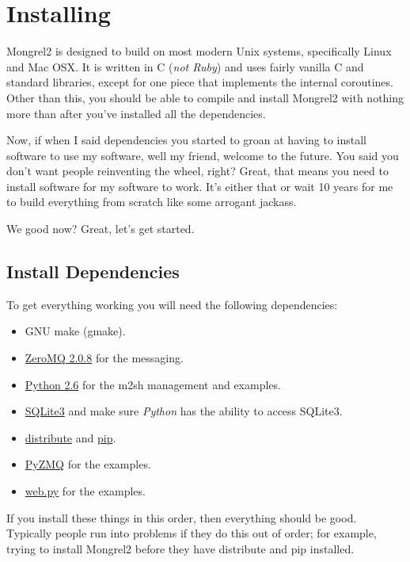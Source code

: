 \chapter{Installing}

Mongrel2 is designed to build on most modern Unix systems, specifically Linux
and Mac OSX.  It is written in C (\emph{not Ruby}) and uses fairly vanilla
C and standard libraries, except for one piece that implements the internal
coroutines.  Other than this, you should be able to compile and install Mongrel2
with nothing more than  after you've installed
all the dependencies.

Now, if when I said dependencies you started to groan at having to install
software to use my software, well my friend, welcome to the future.  You
said you don't want people reinventing the wheel, right?  Great, that means
you need to install software for my software to work.  It's either that or
wait 10 years for me to build everything from scratch like some arrogant
jackass.

We good now?  Great, let's get started.

\section{Install Dependencies}

To get everything working you will need the following dependencies:

\begin{itemize}
\item GNU make (gmake).
\item \href{http://zeromq.org}{ZeroMQ 2.0.8} for the messaging.
\item \href{http://python.org}{Python 2.6} for the m2sh management and examples.
\item \href{http://www.sqlite.org/}{SQLite3} and make sure \emph{Python} has the ability to access SQLite3.
\item \href{http://pypi.python.org/pypi/distribute}{distribute} and \href{http://pypi.python.org/pypi/pip/0.7.2}{pip}.
\item \href{http://github.com/zeromq/pyzmq}{PyZMQ} for the examples.
\item \href{http://webpy.org/}{web.py} for the examples.
\end{itemize}

If you install these things in this order, then everything should be good.
Typically people run into problems if they do this out of order; for example,
trying to install Mongrel2 before they have distribute and pip installed.

